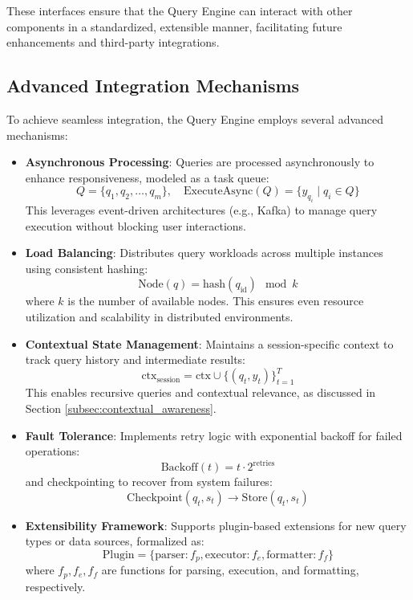 \documentclass[11pt]{article}
\begin{document}
These interfaces ensure that the Query Engine can interact with other components in a standardized, extensible manner, facilitating future enhancements and third-party integrations.

\subsection{Advanced Integration Mechanisms}
\label{subsec:integration_mechanisms}

To achieve seamless integration, the Query Engine employs several advanced mechanisms:

\begin{itemize}
    \item \textbf{Asynchronous Processing}: Queries are processed asynchronously to enhance responsiveness, modeled as a task queue:
        \[
        Q = \{ q_1, q_2, \ldots, q_m \}, \quad \text{ExecuteAsync}(Q) = \{ y_{q_i} \mid q_i \in Q \}
        \]
        This leverages event-driven architectures (e.g., Kafka) to manage query execution without blocking user interactions.

    \item \textbf{Load Balancing}: Distributes query workloads across multiple instances using consistent hashing:
        \[
        \text{Node}(q) = \text{hash}(q_{\text{id}}) \mod k
        \]
        where \( k \) is the number of available nodes. This ensures even resource utilization and scalability in distributed environments.

    \item \textbf{Contextual State Management}: Maintains a session-specific context to track query history and intermediate results:
        \[
        \text{ctx}_{\text{session}} = \text{ctx} \cup \{ (q_t, y_t) \}_{t=1}^T
        \]
        This enables recursive queries and contextual relevance, as discussed in Section \ref{subsec:contextual_awareness}.

    \item \textbf{Fault Tolerance}: Implements retry logic with exponential backoff for failed operations:
        \[
        \text{Backoff}(t) = t \cdot 2^{\text{retries}}
        \]
        and checkpointing to recover from system failures:
        \[
        \text{Checkpoint}(q_t, s_t) \rightarrow \text{Store}(q_t, s_t)
        \]

    \item \textbf{Extensibility Framework}: Supports plugin-based extensions for new query types or data sources, formalized as:
        \[
        \text{Plugin} = \{ \text{parser}: f_p, \text{executor}: f_e, \text{formatter}: f_f \}
        \]
        where \( f_p, f_e, f_f \) are functions for parsing, execution, and formatting, respectively.
\end{itemize}
\end{document}
